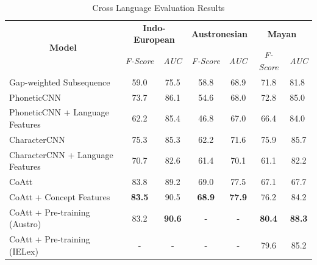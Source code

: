 \documentclass[11pt,letterpaper]{article}
\begin{document}
\begin{table}[t]
\centering
\begin{tabular}{lcccccc}
\multicolumn{1}{c}{\multirow{2}{*}{\textbf{Model}}} & \multicolumn{2}{c}{\textbf{Indo-European}} & \multicolumn{2}{c}{\textbf{Austronesian}} & \multicolumn{2}{c}{\textbf{Mayan}}                  \\ \cline{2-7} 
\multicolumn{1}{c}{}                                & \textit{F-Score}      & \textit{AUC}       & \textit{F-Score}      & \textit{AUC}      & \textit{F-Score} & \multicolumn{1}{l}{\textit{AUC}} \\ \hline
Gap-weighted Subsequence                            & 59.0                  & 75.5               & 58.8                  & 68.9              & 71.8             & \multicolumn{1}{l}{81.8}         \\ \hline
PhoneticCNN                                         & 73.7                  & 86.1               & 54.6                  & 68.0              & 72.8             & \multicolumn{1}{l}{85.0}         \\
PhoneticCNN + Language Features                     & 62.2                  & 85.4               & 46.8                  & 67.0              & 66.4             & \multicolumn{1}{l}{84.0}         \\
CharacterCNN                                        & 75.3                  & 85.3               & 62.2                  & 71.6              & 75.9             & 85.7                             \\
CharacterCNN + Language Features                    & 70.7                  & 82.6               & 61.4                  & 70.1              & 61.1             & 82.2                             \\ \hline
CoAtt                                               & 83.8                  & 89.2               & 69.0                  & 77.5              & 67.1             & 67.7                             \\
CoAtt + Concept Features                            & \textbf{83.5}         & 90.5               & \textbf{68.9}         & \textbf{77.9}     & 76.2             & 84.2                             \\
CoAtt + Pre-training (Austro)                       & 83.2                  & \textbf{90.6}      & -                     & -                 & \textbf{80.4}    & \textbf{88.3}                    \\
CoAtt + Pre-training (IELex)                        & -                     & -                  & -                     & -                 & 79.6             & 85.2                            
\end{tabular}
\label{CL_res}
\caption{Cross Language Evaluation Results}
\end{table}
\end{document}
